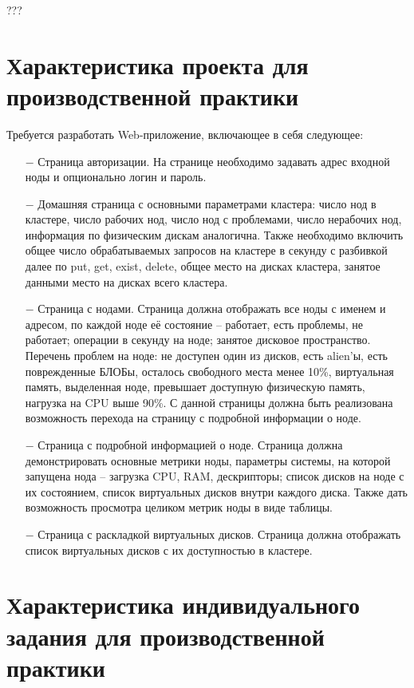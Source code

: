 ??? 

\clearpage

\section{Характеристика проекта для производственной практики}

Требуется разработать Web-приложение, включающее в себя следующее: 

\begin{enumerate}
  \item[$-$] Страница авторизации. На странице необходимо задавать адрес входной ноды и опционально логин и пароль.
  \item[$-$] Домашняя страница с основными параметрами кластера: число нод в кластере, число рабочих нод, число нод с проблемами, число нерабочих нод, информация по физическим дискам аналогична. Также необходимо включить общее число обрабатываемых запросов на кластере в секунду с разбивкой далее по put, get, exist, delete, общее место на дисках кластера, занятое данными место на дисках всего кластера. 
  \item[$-$] Страница с нодами. Страница должна отображать все ноды с именем и адресом, по каждой ноде её состояние -- работает, есть проблемы, не работает; операции в секунду на ноде; занятое дисковое пространство. Перечень проблем на ноде: не доступен один из дисков, есть alien’ы, есть поврежденные БЛОБы, осталось свободного места менее 10\%, виртуальная память, выделенная ноде, превышает доступную физическую память, нагрузка на CPU выше 90\%. С данной страницы должна быть реализована возможность перехода на страницу с подробной информации о ноде.
  \item[$-$] Страница с подробной информацией о ноде. Страница должна демонстрировать основные метрики ноды, параметры системы, на которой запущена нода -- загрузка CPU, RAM, дескрипторы; список дисков на ноде с их состоянием, список виртуальных дисков внутри каждого диска. Также дать возможность просмотра целиком метрик ноды в виде таблицы.
  \item[$-$] Страница с раскладкой виртуальных дисков. Страница должна отображать список виртуальных дисков с их доступностью в кластере.
\end{enumerate}

\clearpage

\section{Характеристика индивидуального задания для производственной практики}

